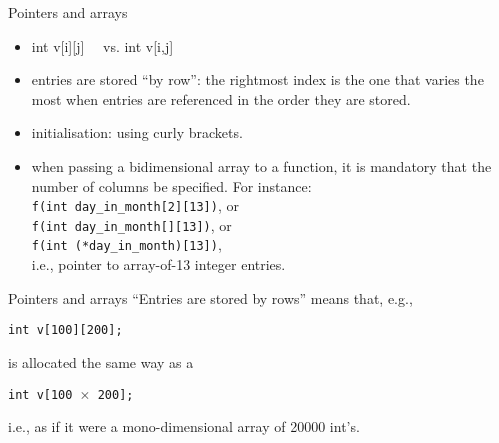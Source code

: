 \begin{frame}[fragile]{Pointers and arrays}
\begin{itemize}
\item int v[i][j] \ \ vs. int v[i,j]
\item entries are stored ``by row'': the rightmost index is the
  one that varies the most when entries are referenced in the order
  they are stored.
\item initialisation: using curly brackets.
\item when passing a bidimensional array to a function,
      it is mandatory that the number of columns be specified.
For instance: \\
\verb"f(int day_in_month[2][13])", or \\
\verb"f(int day_in_month[][13])", or \\
\verb"f(int (*day_in_month)[13])", \\
i.e., pointer to array-of-13 integer entries.
\end{itemize}


\end{frame}
\begin{frame}[fragile]{Pointers and arrays}
``Entries are stored by rows'' means that, e.g., 

\vspace{20pt}

\begin{center}
\tt int v[100][200];
\end{center}

\vspace{20pt}

is allocated the same way as a

\vspace{20pt}

\begin{center}
\tt int v[100 $\times$ 200];
\end{center}

\vspace{20pt}

i.e., as if it were a mono-dimensional array of 20000 int's.


\end{frame}
